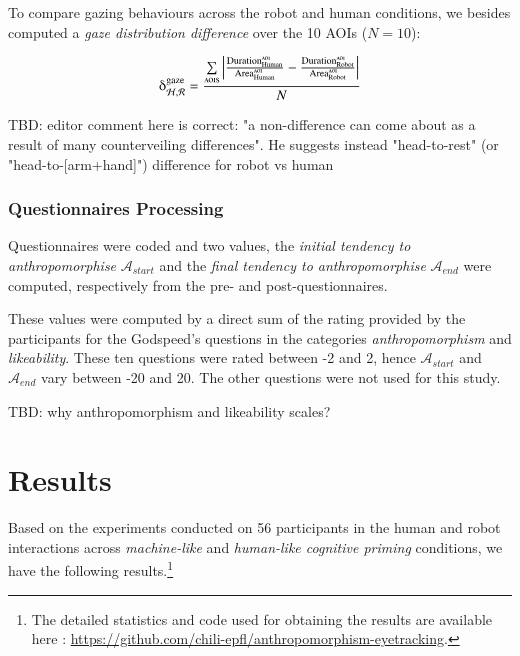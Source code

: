 \documentclass[lettersize, noapacite, twoside, HRI]{apa_HRI}
\newcommand{\anti}{{$\mathcal{A}_{start}$\xspace}}
\newcommand{\antf}{{$\mathcal{A}_{end}$\xspace}}
\begin{document}
To compare gazing behaviours across the robot and human conditions, we besides
computed a \emph{gaze distribution difference} over the 10 AOIs ($N=10$):

{\Large
\[
    \delta_{\mathcal{H}, \mathcal{R}}^{\text{gaze}} =
    \frac{\sum\limits_{{\text{{\sc aoi}s}}}\left |
    \frac{\text{Duration}_{\text{Human}}^{\text{\sc
aoi}}}{\text{Area}_{\text{Human}}^{\text{\sc aoi}}} -
\frac{\text{Duration}_{\text{Robot}}^{\text{\sc
aoi}}}{\text{Area}_{\text{Robot}}^{\text{\sc aoi}}} \right |}{N}
\]
}

TBD: editor comment here is correct: "a non-difference can come about as a
result of many counterveiling differences". He suggests instead "head-to-rest"
(or "head-to-[arm+hand]") difference for robot vs human


\subsubsection{Questionnaires Processing}
\label{questionnaires_processing}

Questionnaires were coded and two values, the \emph{initial tendency to
anthropomorphise} \anti{} and the \emph{final tendency to anthropomorphise} \antf{}
were computed, respectively from the pre- and post-questionnaires.

These values were computed by a direct sum of the rating provided by the
participants for the Godspeed's questions in the categories
\emph{anthropomorphism} and \emph{likeability}. These ten questions were rated
between -2 and 2, hence \anti{} and \antf{} vary between -20 and 20. The other
questions were not used for this study.

TBD: why anthropomorphism and likeability scales?

\section{Results}

Based on the experiments conducted on 56 participants in the human and robot
interactions across \emph{machine-like} and \emph{human-like cognitive priming} conditions,
we have the following results.\footnote{The detailed statistics and code used
    for obtaining the results are available here :
\url{https://github.com/chili-epfl/anthropomorphism-eyetracking}.}
\end{document}
